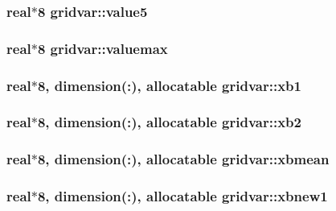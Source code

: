 \subsubsection[{value5}]{\setlength{\rightskip}{0pt plus 5cm}real$\ast$8 gridvar\+::value5}\label{namespacegridvar_a883f353750cac83a1357c0703986263d}
\hypertarget{namespacegridvar_a03c8e52b6729ce5c1acc022a80473142}{}
\subsubsection[{valuemax}]{\setlength{\rightskip}{0pt plus 5cm}real$\ast$8 gridvar\+::valuemax}\label{namespacegridvar_a03c8e52b6729ce5c1acc022a80473142}
\hypertarget{namespacegridvar_ac19951c0ef8b36fd21139054f5e224e2}{}
\subsubsection[{xb1}]{\setlength{\rightskip}{0pt plus 5cm}real$\ast$8, dimension(\+:), allocatable gridvar\+::xb1}\label{namespacegridvar_ac19951c0ef8b36fd21139054f5e224e2}
\hypertarget{namespacegridvar_a66083c9a2a9d76f40ec6db31fe43e4aa}{}
\subsubsection[{xb2}]{\setlength{\rightskip}{0pt plus 5cm}real$\ast$8, dimension(\+:), allocatable gridvar\+::xb2}\label{namespacegridvar_a66083c9a2a9d76f40ec6db31fe43e4aa}
\hypertarget{namespacegridvar_acee1a1e22370f51e5af53bda6cdececc}{}
\subsubsection[{xbmean}]{\setlength{\rightskip}{0pt plus 5cm}real$\ast$8, dimension(\+:), allocatable gridvar\+::xbmean}\label{namespacegridvar_acee1a1e22370f51e5af53bda6cdececc}
\hypertarget{namespacegridvar_a53c057251ce468ac480e633a8872773a}{}
\subsubsection[{xbnew1}]{\setlength{\rightskip}{0pt plus 5cm}real$\ast$8, dimension(\+:), allocatable gridvar\+::xbnew1}\label{namespacegridvar_a53c057251ce468ac480e633a8872773a}
\hypertarget{namespacegridvar_af05e411d94cae29c5a5ac414c9d43621}{}
